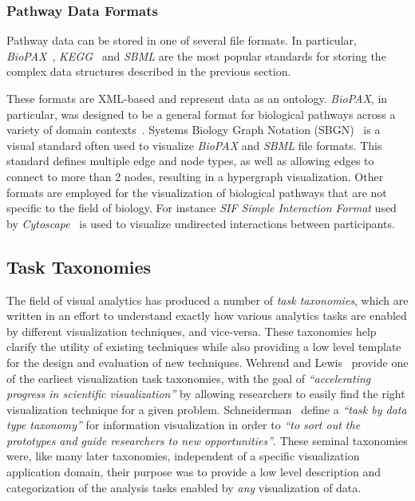 \subsubsection*{Pathway Data Formats}
Pathway data can be stored in one of several file formats.
In particular, \textit{BioPAX}~\cite{demir2010biopax}, \textit{KEGG}~\cite{kanehisa2000kegg} and \textit{SBML} \cite{Hucka2003} are the most popular standards for storing the complex data structures described in the previous section.

These formats are XML-based and represent data as an ontology.
\emph{BioPAX}, in particular, was designed to be a general format for biological pathways across a variety of domain contexts~\cite{demir2010biopax}.
Systems Biology Graph Notation (SBGN)~\cite{Novere2009} is a visual standard often used to visualize \textit{BioPAX} and \textit{SBML} file formats.
This standard defines multiple edge and node types, as well as allowing edges to connect to more than 2 nodes, resulting in a hypergraph visualization.
Other formats are employed for the visualization of biological pathways that are not specific to the field of biology.
For instance \textit{SIF Simple Interaction Format} used by \textit{Cytoscape}~\cite{Shannon2003cytoscape} is used to visualize undirected interactions between participants.




\subsection*{Task Taxonomies}
The field of visual analytics has produced a number of \textit{task taxonomies}, which are written in an effort to understand exactly how various analytics tasks are enabled by different visualization techniques, and vice-versa.
These taxonomies help clarify the utility of existing techniques while also providing a low level template for the design and evaluation of new techniques.
Wehrend and Lewis~\cite{Wehrend1990} provide one of the earliest visualization task taxonomies, with the goal of \textit{``accelerating progress in scientific visualization''} by allowing researchers to easily find the right visualization technique for a given problem.
Schneiderman~\cite{Shneiderman1996} define a \textit{``task by data type taxonomy''} for information visualization in order to \textit{``to sort out the prototypes and guide researchers to new opportunities''}.
These seminal taxonomies were, like many later taxonomies, independent of a specific visualization application domain, their purpose was to provide a low level description and categorization of the analysis tasks enabled by \textit{any} visualization of data.

